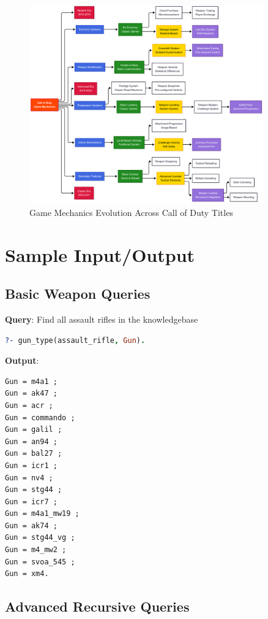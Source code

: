 \documentclass[12pt,a4paper]{article}
\begin{document}
\begin{figure}[H]
    \centering
    \includegraphics[width=0.9\textwidth]{../diagrams/game-mechanics-evolution-tree-vertical.png}
    \caption{Game Mechanics Evolution Across Call of Duty Titles}
\end{figure}

\section{Sample Input/Output}

\subsection{Basic Weapon Queries}

\textbf{Query}: Find all assault rifles in the knowledgebase
\begin{lstlisting}[language=Prolog]
?- gun_type(assault_rifle, Gun).
\end{lstlisting}

\textbf{Output}:
\begin{lstlisting}
Gun = m4a1 ;
Gun = ak47 ;
Gun = acr ;
Gun = commando ;
Gun = galil ;
Gun = an94 ;
Gun = bal27 ;
Gun = icr1 ;
Gun = nv4 ;
Gun = stg44 ;
Gun = icr7 ;
Gun = m4a1_mw19 ;
Gun = ak74 ;
Gun = stg44_vg ;
Gun = m4_mw2 ;
Gun = svoa_545 ;
Gun = xm4.
\end{lstlisting}

\subsection{Advanced Recursive Queries}
\end{document}

